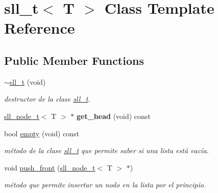 \hypertarget{classsll__t}{}\section{sll\+\_\+t$<$ T $>$ Class Template Reference}
\label{classsll__t}
\subsection*{Public Member Functions}
\begin{DoxyCompactItemize}
\item 
\mbox{\label{classsll__t_a3bcfaf33cdd5623a5601cbdcabb067fd}} 
\hyperlink{classsll__t_a3bcfaf33cdd5623a5601cbdcabb067fd}{$\sim$sll\+\_\+t} (void)
\begin{DoxyCompactList}\small\item\em destructor de la clase \hyperlink{classsll__t}{sll\+\_\+t}. \end{DoxyCompactList}\item 
\mbox{\label{classsll__t_aabaf5c67b4585221190e621a949bb809}} 
\hyperlink{classsll__node__t}{sll\+\_\+node\+\_\+t}$<$ T $>$ $\ast$ {\bfseries get\+\_\+head} (void) const
\item 
\mbox{\label{classsll__t_a19f025576d54ffb71af023040e0d16af}} 
bool \hyperlink{classsll__t_a19f025576d54ffb71af023040e0d16af}{empty} (void) const
\begin{DoxyCompactList}\small\item\em método de la clase \hyperlink{classsll__t}{sll\+\_\+t} que permite saber si una lista está vacía. \end{DoxyCompactList}\item 
\mbox{\label{classsll__t_ad77beab624446c579cfb023eb713c48f}} 
void \hyperlink{classsll__t_ad77beab624446c579cfb023eb713c48f}{push\+\_\+front} (\hyperlink{classsll__node__t}{sll\+\_\+node\+\_\+t}$<$ T $>$ $\ast$)
\begin{DoxyCompactList}\small\item\em método que permite insertar un nodo en la lista por el principio. \end{DoxyCompactList}\item 
\mbox{\label{classsll__t_a27c36ba6bbb9b40fec134e6909ff490b}} 

\end{DoxyCompactItemize}
